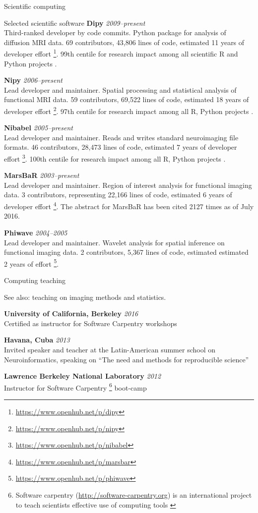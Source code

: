 \documentclass{cv}
\newcommand{\PlaceDateNote}[3]{{\bf #1} \hfill {\em #2} \\#3}
\newcommand{\UCB}{University of California, Berkeley}
\begin{document}
\begin{cvSection}{Scientific computing}
\begin{cvSubSection}{Selected scientific software}
\PlaceDateNote{Dipy}{2009--present}
{Third-ranked developer by code commits.  Python package for analysis of
    diffusion MRI data.  69 contributors, 43,806 lines of code, estimated 11
    years of developer effort
    \footnote{\url{https://www.openhub.net/p/dipy}}. 99th centile for research
impact among all scientific R and Python projects .}

\PlaceDateNote{Nipy}{2006--present}
{Lead developer and maintainer.  Spatial processing and statistical analysis
of functional MRI data.  59 contributors, 69,522 lines of code, estimated 18
years of developer effort \footnote{\url{https://www.openhub.net/p/nipy}}.
97th centile for research impact among all R, Python projects
.}

\PlaceDateNote{Nibabel}{2005--present}
{Lead developer and maintainer. Reads and writes standard neuroimaging file
    formats.  46 contributors, 28,473 lines of code, estimated 7 years of
    developer effort \footnote{\url{https://www.openhub.net/p/nibabel}}.
    100th centile for research impact among all R, Python projects
\footref{depsy}.}

\PlaceDateNote{MarsBaR}{2003--present}
{Lead developer and maintainer. Region of interest analysis for functional
    imaging data.  3 contributors, representing 22,166 lines of code,
estimated 6 years of developer effort
\footnote{\url{https://www.openhub.net/p/marsbar}}.  The abstract for MarsBaR
has been cited 2127 times as of July 2016.}

\PlaceDateNote{Phiwave}{2004--2005}
{Lead developer and maintainer.  Wavelet analysis for spatial inference on
functional imaging data.  2 contributors, 5,367 lines of code, estimated
estimated 2 years of effort
\footnote{\url{https://www.openhub.net/p/phiwave}}.}

\end{cvSubSection}

\begin{cvSubSection}{Computing teaching}

See also: teaching on imaging methods and statistics.

\PlaceDateNote{\UCB}{2016}
{Certified as instructor for Software Carpentry workshops }

\PlaceDateNote{Havana, Cuba}{2013}
{Invited speaker and teacher at the Latin-American summer school on
Neuroinformatics, speaking on ``The need and methods for reproducible
science''}

\PlaceDateNote{Lawrence Berkeley National Laboratory}{2012}
{Instructor for Software Carpentry
    \footnote{
        Software carpentry (\url{http://software-carpentry.org}) is an
        international project to teach scientists effective use of computing
        tools
\label{swc}}
boot-camp}


\end{cvSubSection}
\end{cvSection}
\end{document}
